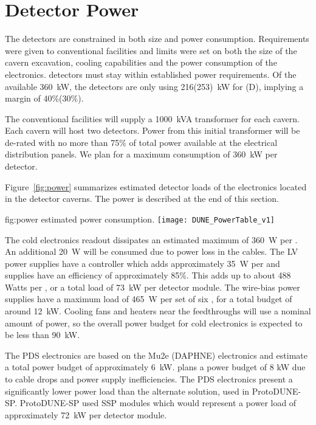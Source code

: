\section{Detector Power}
\label{sec:fdsp-coord-faci-power}

The  detectors are constrained in both size and power
consumption.  Requirements were given to conventional facilities and
limits were set on both the size of the cavern excavation, cooling
capabilities and the power consumption of the
electronics.  detectors must stay within established power
requirements. Of the available 360~kW, the detectors are only using
216(253)~kW for (D), implying a margin of 40\%(30\%).

The conventional facilities will supply a 1000~kVA transformer for
each cavern.  Each cavern will host two  detectors.  Power from
this initial transformer will be de-rated with no more than 75\%
of total power available at the electrical distribution panels.  We
plan for a maximum consumption of 360~kW per detector.

Figure~\ref{fig:power} summarizes estimated detector loads of the 
 electronics located in the detector caverns.  The  power is 
described at the end of this section. 
\begin{dunefigure}
{fig:power}
{ estimated power consumption.}
  \texttt{[image: DUNE\_PowerTable\_v1]}
\end{dunefigure}


The cold electronics readout dissipates an estimated maximum of 360~W
per . An additional 20~W will be consumed due to power loss in the
cables.  The LV power supplies have a controller which adds
approximately 35~W per  and supplies have an efficiency of
approximately 85\%. This adds up to about 488 Watts per , or a
total load of 73~kW per detector module. The  wire-bias power
supplies have a maximum load of 465~W per set of six , for a total
budget of around 12~kW. Cooling fans and heaters near the feedthroughs
will use a nominal amount of power, so the overall power budget for
cold electronics is expected to be less than 90~kW.

The PDS electronics are based on the Mu2e (DAPHNE) electronics and estimate a
total power budget of approximately 6~kW.  plans a power budget of
8 kW due to cable drops and power supply inefficiencies.  The PDS
electronics present a significantly lower power load than the
alternate solution, used in ProtoDUNE-SP.  ProtoDUNE-SP used SSP
modules which would represent a power load of approximately 72~kW per
detector module.

